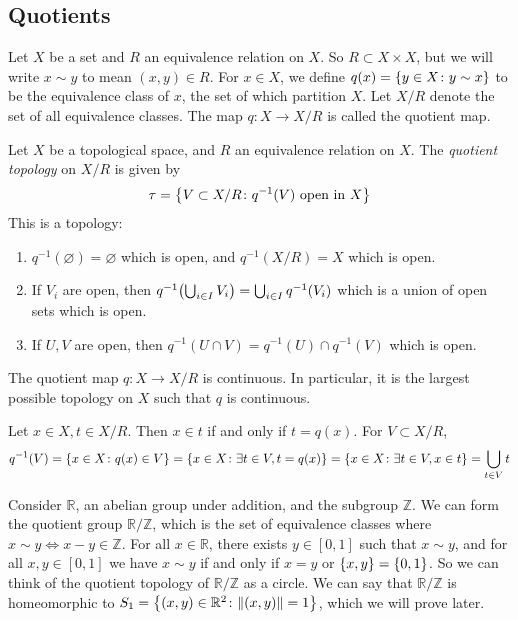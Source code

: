 \subsection{Quotients}
Let \( X \) be a set and \( R \) an equivalence relation on \( X \).
So \( R \subset X \times X \), but we will write \( x \sim y \) to mean \( (x,y) \in R \).
For \( x \in X \), we define \( q(x) = \qty{y \in X \colon y \sim x} \) to be the equivalence class of \( x \), the set of which partition \( X \).
Let \( X / R \) denote the set of all equivalence classes.
The map \( q \colon X \to X/R \) is called the quotient map.
\begin{definition}
	Let \( X \) be a topological space, and \( R \) an equivalence relation on \( X \).
	The \textit{quotient topology} on \( X/R \) is given by
	\[
		\tau = \qty{V \subset X/R \colon q^{-1}(V) \text{ open in } X }
	\]
	This is a topology:
	\begin{enumerate}
		\item \( q^{-1}(\varnothing) = \varnothing \) which is open, and \( q^{-1}(X/R) = X \) which is open.
		\item If \( V_i \) are open, then \( q^{-1}\qty(\bigcup_{i \in I} V_i) = \bigcup_{i \in I} q^{-1}(V_i) \) which is a union of open sets which is open.
		\item If \( U, V \) are open, then \( q^{-1}(U \cap V) = q^{-1}(U) \cap q^{-1}(V) \) which is open.
	\end{enumerate}
\end{definition}
\begin{remark}
	The quotient map \( q \colon X \to X/R \) is continuous.
	In particular, it is the largest possible topology on \( X \) such that \( q \) is continuous.

	Let \( x \in X, t \in X/R \).
	Then \( x \in t \) if and only if \( t = q(x) \).
	For \( V \subset X/R \),
	\[
		q^{-1}(V) = \qty{x \in X \colon q(x) \in V} = \qty{x \in X \colon \exists t \in V, t = q(x)} = \qty{x \in X \colon \exists t \in V, x \in t} = \bigcup_{t \in V} t
	\]
\end{remark}
\begin{example}
	Consider \( \mathbb R \), an abelian group under addition, and the subgroup \( \mathbb Z \).
	We can form the quotient group \( \mathbb R / \mathbb Z \), which is the set of equivalence classes where \( x \sim y \iff x - y \in \mathbb Z \).
	For all \( x \in \mathbb R \), there exists \( y \in [0,1] \) such that \( x \sim y \), and for all \( x, y \in [0,1] \) we have \( x \sim y \) if and only if \( x = y \) or \( \qty{x,y} = \qty{0,1} \).
	So we can think of the quotient topology of \( \mathbb R / \mathbb Z \) as a circle.
	We can say that \( \mathbb R / \mathbb Z \) is homeomorphic to \( S_1 = \qty{(x,y) \in \mathbb R^2 \colon \norm{(x,y)} = 1} \), which we will prove later.
\end{example}

